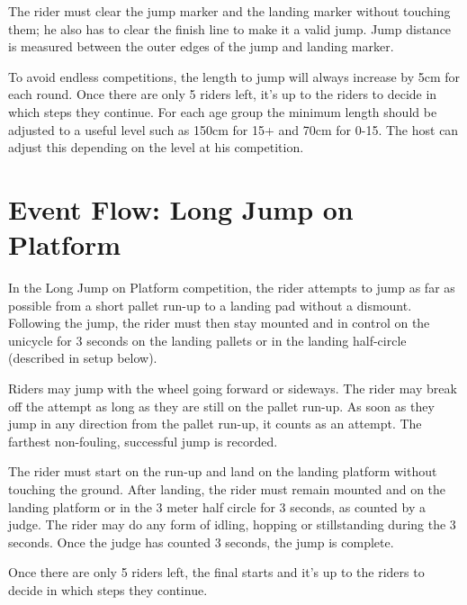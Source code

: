 The rider must clear the jump marker and the landing marker without touching them; he also has to clear the finish line to make it a valid jump.
Jump distance is measured between the outer edges of the jump and landing marker.

To avoid endless competitions, the length to jump will always increase by 5cm for each round.
Once there are only 5 riders left, it's up to the riders to decide in which steps they continue.
For each age group the minimum length should be adjusted to a useful level such as 150cm for 15+ and 70cm for 0-15.
The host can adjust this depending on the level at his competition.

\section{Event Flow: Long Jump on Platform}
In the Long Jump on Platform competition, the rider attempts to jump as far as possible from a short pallet run-up to a landing pad without a dismount.
Following the jump, the rider must then stay mounted and in control on the unicycle for 3 seconds on the landing pallets or in the landing half-circle (described in setup below).

Riders may jump with the wheel going forward or sideways.
The rider may break off the attempt as long as they are still on the pallet run-up.
As soon as they jump in any direction from the pallet run-up, it counts as an attempt.
The farthest non-fouling, successful jump is recorded.

The rider must start on the run-up and land on the landing platform without touching the ground.
After landing, the rider must remain mounted and on the landing platform or in the 3 meter half circle for 3 seconds, as counted by a judge.
The rider may do any form of idling, hopping or stillstanding during the 3 seconds.
Once the judge has counted 3 seconds, the jump is complete.

Once there are only 5 riders left, the final starts and it’s up to the riders to decide in which steps they continue. 


